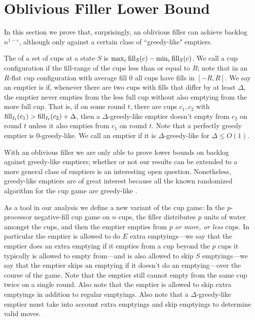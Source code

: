 \section{Oblivious Filler Lower Bound}\label{sec:oblivious}
In this section we prove that, surprisingly, an oblivious filler
can achieve backlog $n^{1-\varepsilon}$, although only against a
certain class of ``greedy-like" emptiers.

The  of a set of cups at a state $S$ is $\max_c
\operatorname{\textnormal{fill}}_S(c) - \min_c \operatorname{\textnormal{fill}}_S(c)$. We call a cup configuration
 if the fill-range of the cups less than or equal to
$R$; note that in an $R$-flat cup configuration with average fill
$0$ all cups have fills in $[-R, R]$. We say an emptier is
 if, whenever there are two cups with
fills that differ by at least $\Delta$, the emptier never empties
from the less full cup without also emptying from the more full
cup. That is, if on some round $t$, there are cups $c_1, c_2$
with $\operatorname{\textnormal{fill}}_{I_t}(c_1) > \operatorname{\textnormal{fill}}_{I_t}(c_2) + \Delta$, then a
$\Delta$-greedy-like emptier doesn't empty from $c_2$ on round
$t$ unless it also empties from $c_1$ on round $t$. Note that a
perfectly greedy emptier is $0$-greedy-like. We call an emptier
 if it is $\Delta$-greedy-like for $\Delta \le
O(1)$. 

With an oblivious filler we are only able to prove lower bounds
on backlog against greedy-like emptiers; whether or not our
results can be extended to a more general class of emptiers is an
interesting open question. Nonetheless, greedy-like emptiers are
of great interest because all the known randomized algorithm for
the cup game are greedy-like \cite{mbe19, wku20}.

As a tool in our analysis we define a new variant of the cup
game: In the $p$-processor 
 negative-fill cup game on $n$ cups, the filler
distributes $p$ units of water amongst the cups, and then the
emptier empties from $p$ \textit{or more, or less} cups. In
particular the emptier is allowed to do $E$ extra
emptyings---we say that the emptier does an extra emptying if
it empties from a cup beyond the $p$ cups it typically is
allowed to empty from---and is also allowed to skip $S$
emptyings---we say that the emptier skips an emptying if it
doesn't do an emptying---over the course of the
game. Note that the emptier still cannot empty from the same cup
twice on a single round. Also note that the emptier is allowed to
skip extra emptyings in addition to regular emptyings. Also note
that a $\Delta$-greedy-like emptier must take into account extra
emptyings and skip emptyings to determine valid moves. 

